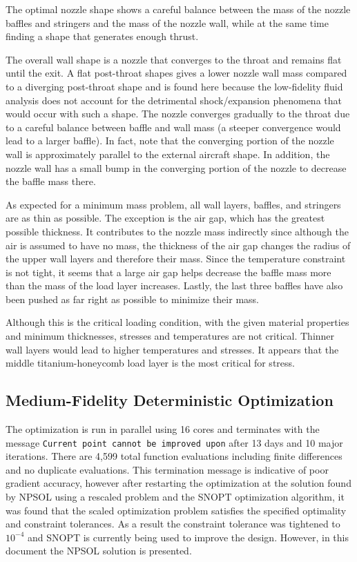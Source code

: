 \documentclass{article}
\begin{document}
The optimal nozzle shape shows a careful balance between the mass of the nozzle baffles and stringers and the mass of the nozzle wall, while at the same time finding a shape that generates enough thrust.

The overall wall shape is a nozzle that converges to the throat and remains flat until the exit. A flat post-throat shapes gives a lower nozzle wall mass compared to a diverging post-throat shape and is found here because the low-fidelity fluid analysis does not account for the detrimental shock/expansion phenomena that would occur with such a shape. The nozzle converges gradually to the throat due to a careful balance between baffle and wall mass (a steeper convergence would lead to a larger baffle). In fact, note that the converging portion of the nozzle wall is approximately parallel to the external aircraft shape. In addition, the nozzle wall has a small bump in the converging portion of the nozzle to decrease the baffle mass there.

As expected for a minimum mass problem, all wall layers, baffles, and stringers are as thin as possible. The exception is the air gap, which has the greatest possible thickness. It contributes to the nozzle mass indirectly since although the air is assumed to have no mass, the thickness of the air gap changes the radius of the upper wall layers and therefore their mass. Since the temperature constraint is not tight, it seems that a large air gap helps decrease the baffle mass more than the mass of the load layer increases. Lastly, the last three baffles have also been pushed as far right as possible to minimize their mass.

Although this is the critical loading condition, with the given material properties and minimum thicknesses, stresses and temperatures are not critical. Thinner wall layers would lead to higher temperatures and stresses. It appears that the middle titanium-honeycomb load layer is the most critical for stress.

\subsection{Medium-Fidelity Deterministic Optimization}

The optimization is run in parallel using 16 cores and terminates with the message \texttt{Current point cannot be improved upon} after 13 days and 10 major iterations. There are 4,599 total function evaluations including finite differences and no duplicate evaluations. This termination message is indicative of poor gradient accuracy, however after restarting the optimization at the solution found by NPSOL using a rescaled problem and the SNOPT optimization algorithm, it was found that the scaled optimization problem satisfies the specified optimality and constraint tolerances. As a result the constraint tolerance was tightened to $10^{-4}$ and SNOPT is currently being used to improve the design. However, in this document the NPSOL solution is presented.
\end{document}
